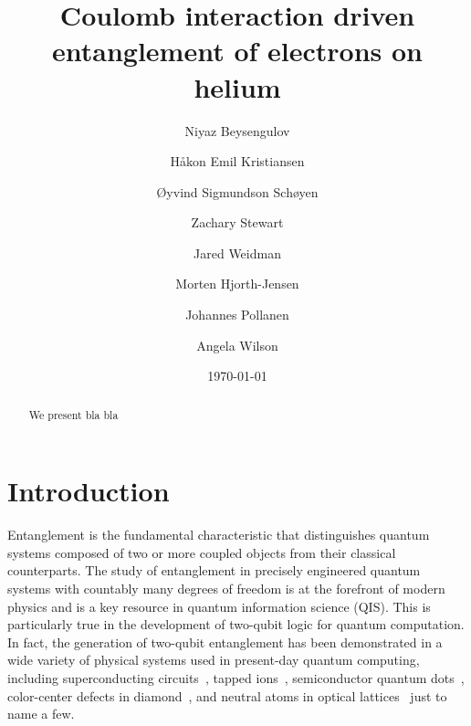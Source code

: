\documentclass[twocolumn,superscriptaddress,unsortedaddress,
 amsmath,amssymb,
 aps,
]{revtex4-2}
\begin{document}

\title{Coulomb interaction driven entanglement of electrons on helium}

\author{Niyaz Beysengulov}
\author{Håkon Emil Kristiansen}
\author{Øyvind Sigmundson Schøyen}
\author{Zachary Stewart}
\author{Jared Weidman}
\author{Morten Hjorth-Jensen}
\author{Johannes Pollanen}
\author{Angela Wilson}
\begin{abstract}
  We present bla bla
\end{abstract}



\date{\today}%


\maketitle

\section{Introduction} %
Entanglement is the fundamental characteristic that distinguishes
quantum systems composed of two or more coupled objects from their classical counterparts. The study of entanglement in precisely engineered quantum systems with countably many degrees of freedom is at the forefront of modern physics and is a key resource in quantum information science (QIS). This is particularly true in the development of two-qubit logic for quantum computation. In fact, the generation of two-qubit entanglement has been demonstrated in a wide variety of physical systems used in present-day quantum computing, including superconducting circuits~\cite{Steffen1423}, tapped ions~\cite{}, semiconductor quantum dots~\cite{Li809}, color-center defects in diamond~\cite{}, and neutral atoms in optical lattices~\cite{Saffman1010} just to name a few.
\end{document}
